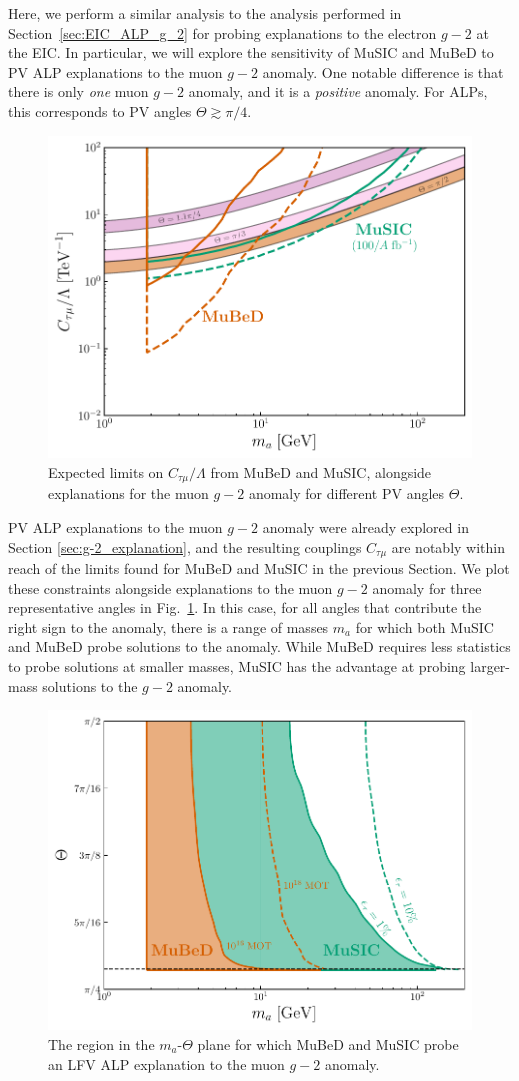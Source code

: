 Here, we perform a similar analysis to the analysis performed in Section~{\ref{sec:EIC_ALP_g_2}} for probing explanations to the electron $g-2$ at the EIC. In particular, we will explore the sensitivity of MuSIC and MuBeD to PV ALP explanations to the muon $g-2$ anomaly. One notable difference is that there is only {\it one} muon $g-2$ anomaly, and it is a {\it positive} anomaly. For ALPs, this corresponds to PV angles $\Theta\gtrsim \pi/4$.
\begin{figure}[t!]
    \centering
    \includegraphics[width=0.6\linewidth]{figures/chapter5/MuSIC_MuBeD_ALP_muon_g_2.pdf}
    \caption[Projected constraints on LFV ALPs at the MuBeD and MuSIC, alongside LFV ALP explanations to the muon $g-2$ anomaly.]{Expected limits on $C_{\tau \mu}/\Lambda$ from MuBeD and MuSIC, alongside explanations for the muon $g-2$ anomaly for different PV angles $\Theta$.}
    \label{fig:MuSIC_MuBeD_g_2}
\end{figure}
PV ALP explanations to the muon $g-2$ anomaly were already explored in Section \ref{sec:g-2_explanation}, and the resulting couplings $C_{\tau\mu}$ are notably within reach of the limits found for MuBeD and MuSIC in the previous Section. We plot these constraints alongside explanations to the muon $g-2$ anomaly for three representative angles in Fig.~\ref{fig:MuSIC_MuBeD_g_2}. In this case, for all angles that contribute the right sign to the anomaly, there is a range of masses $m_a$ for which both MuSIC and MuBeD probe solutions to the anomaly. While MuBeD requires less statistics to probe solutions at smaller masses, MuSIC has the advantage at probing larger-mass solutions to the $g-2$ anomaly.
\begin{figure}[t!]
    \centering
    \includegraphics[width=0.6\linewidth]{figures/chapter5/MuSIC_MuBeD_g_2_probe.pdf}
    \caption[Region in the $m_a$-$\Theta$ plane for which MuBeD and MuSIC probe an LFV ALP explanation to the muon $g-2$ anomaly.]{The region in the $m_a$-$\Theta$ plane for which MuBeD and MuSIC probe an LFV ALP explanation to the muon $g-2$ anomaly.}
    \label{fig:MuSIC_MuBeD_g_2_region}
\end{figure}
